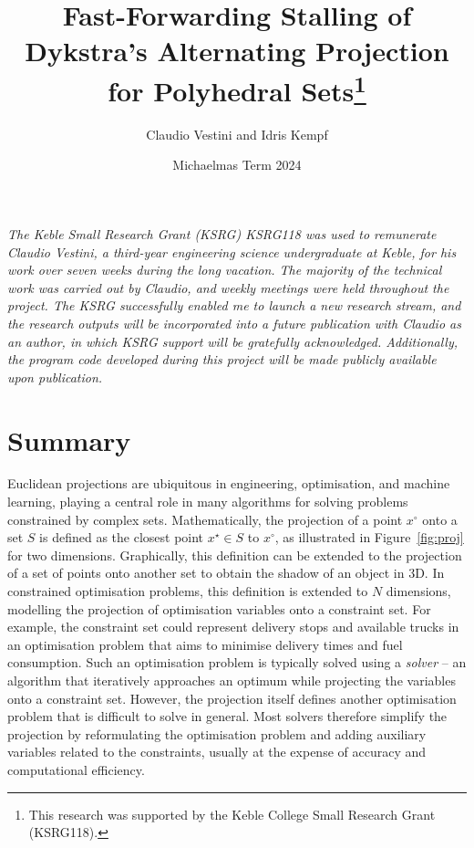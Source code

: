 \documentclass[hidelinks]{article}
\title{Fast-Forwarding Stalling of Dykstra's Alternating Projection for Polyhedral Sets\thanks{This research was supported by the Keble College Small Research Grant (KSRG118).}}
\author{Claudio Vestini and Idris Kempf}
\date{Michaelmas Term 2024}
\begin{document}
\thispagestyle{empty}

\noindent
\textit{
The Keble Small Research Grant (KSRG) KSRG118 was used to remunerate Claudio Vestini, a third-year engineering science undergraduate at Keble, for his work over seven weeks during the long vacation. The majority of the technical work was carried out by Claudio, and weekly meetings were held throughout the project. The KSRG successfully enabled me to launch a new research stream, and the research outputs will be incorporated into a future publication with Claudio as an author, in which KSRG support will be gratefully acknowledged. Additionally, the program code developed during this project will be made publicly available upon publication.
}


\section*{Summary}
Euclidean projections are ubiquitous in engineering, optimisation, and machine learning, playing a central role in many algorithms for solving problems constrained by complex sets. Mathematically, the projection of a point $x^\circ$ onto a set $S$ is defined as the closest point $x^\star\in S$ to $x^\circ$, as illustrated in Figure~\ref{fig:proj} for two dimensions. Graphically, this definition can be extended to the projection of a set of points onto another set to obtain the shadow of an object in 3D. In constrained optimisation problems, this definition is extended to $N$ dimensions, modelling the projection of optimisation variables onto a constraint set. For example, the constraint set could represent delivery stops and available trucks in an optimisation problem that aims to minimise delivery times and fuel consumption. Such an optimisation problem is typically solved using a \textit{solver} -- an algorithm that iteratively approaches an optimum while projecting the variables onto a constraint set. However, the projection itself defines another optimisation problem that is difficult to solve in general. Most solvers therefore simplify the projection by reformulating the optimisation problem and adding auxiliary variables related to the constraints, usually at the expense of accuracy and computational efficiency.
\end{document}
